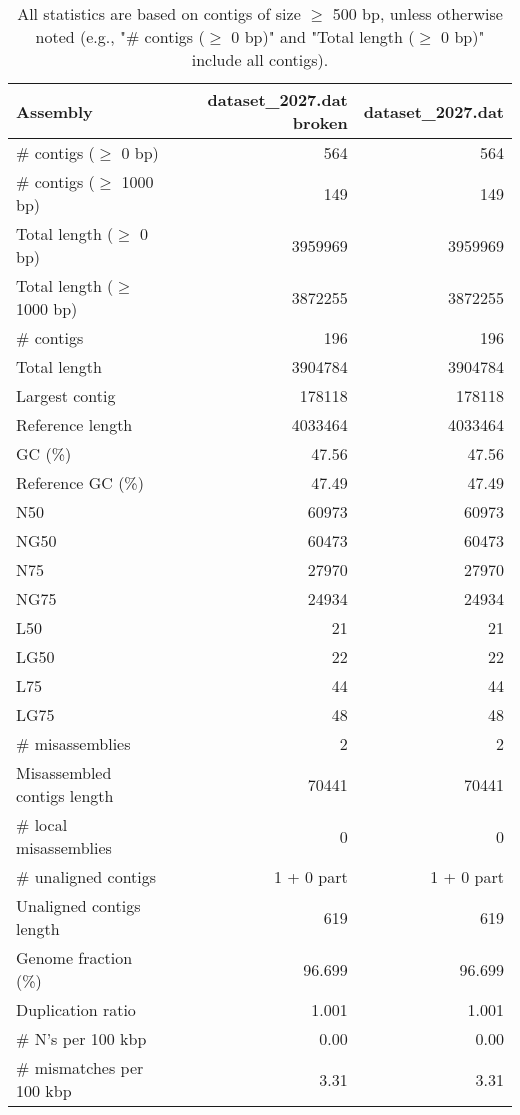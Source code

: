 \documentclass[12pt,a4paper]{article}
\begin{document}
\begin{table}[ht]
\begin{center}
\caption{All statistics are based on contigs of size $\geq$ 500 bp, unless otherwise noted (e.g., "\# contigs ($\geq$ 0 bp)" and "Total length ($\geq$ 0 bp)" include all contigs).}
\begin{tabular}{|l*{2}{|r}|}
\hline
Assembly & dataset\_2027.dat broken & dataset\_2027.dat \\ \hline
\# contigs ($\geq$ 0 bp) & 564 & 564 \\ \hline
\# contigs ($\geq$ 1000 bp) & 149 & 149 \\ \hline
Total length ($\geq$ 0 bp) & 3959969 & 3959969 \\ \hline
Total length ($\geq$ 1000 bp) & 3872255 & 3872255 \\ \hline
\# contigs & 196 & 196 \\ \hline
Total length & 3904784 & 3904784 \\ \hline
Largest contig & 178118 & 178118 \\ \hline
Reference length & 4033464 & 4033464 \\ \hline
GC (\%) & 47.56 & 47.56 \\ \hline
Reference GC (\%) & 47.49 & 47.49 \\ \hline
N50 & 60973 & 60973 \\ \hline
NG50 & 60473 & 60473 \\ \hline
N75 & 27970 & 27970 \\ \hline
NG75 & 24934 & 24934 \\ \hline
L50 & 21 & 21 \\ \hline
LG50 & 22 & 22 \\ \hline
L75 & 44 & 44 \\ \hline
LG75 & 48 & 48 \\ \hline
\# misassemblies & 2 & 2 \\ \hline
Misassembled contigs length & 70441 & 70441 \\ \hline
\# local misassemblies & 0 & 0 \\ \hline
\# unaligned contigs & 1 + 0 part & 1 + 0 part \\ \hline
Unaligned contigs length & 619 & 619 \\ \hline
Genome fraction (\%) & 96.699 & 96.699 \\ \hline
Duplication ratio & 1.001 & 1.001 \\ \hline
\# N's per 100 kbp & 0.00 & 0.00 \\ \hline
\# mismatches per 100 kbp & 3.31 & 3.31 \\ \hline

\end{tabular}
\end{center}
\end{table}
\end{document}
